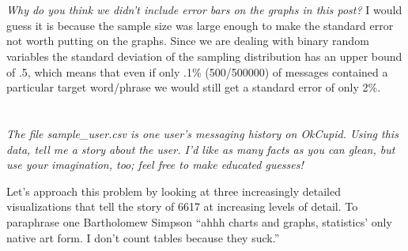 \documentclass[a4paper,12pt]{article}
\begin{document}
\section{}
\emph{Why do you think we didn't include error bars on the graphs in this post?}
I would guess it is because the sample size was large enough to make the standard error not worth putting on the graphs.  Since we are dealing with binary random variables the standard deviation of the sampling distribution has an upper bound of .5, which means that even if only .1\% (500/500000) of messages contained a particular target word/phrase we would still get a standard error of only 2\%.  

\section{}
\emph{The file sample\_user.csv is one user's messaging history on OkCupid. Using this data, tell me a story
about the user. I’d like as many facts as you can glean, but use your imagination, too; feel free to make
educated guesses!}

Let's approach this problem by looking at three increasingly detailed visualizations that tell the story of 6617 at increasing levels of detail.  To paraphrase one Bartholomew Simpson ``ahhh charts and graphs, statistics' only native art form. I don't count tables because they suck.''
\end{document}
